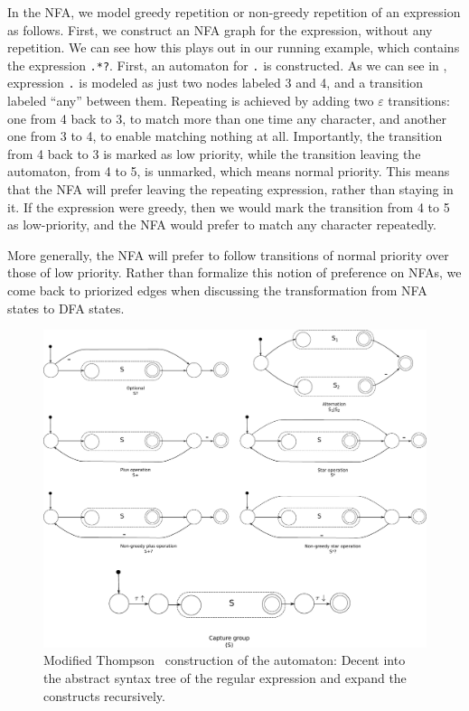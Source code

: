 \documentclass[english]{sigplanconf}
\theoremstyle{definition}
\begin{document}
In the NFA, we model greedy repetition or non-greedy repetition of
an expression as follows.  First, we construct an NFA graph for the
expression, without any repetition.  We can see how this plays out
in our running example, which contains the expression \texttt{.*?}.
First, an automaton for \texttt{.} is constructed.  As we can see
in , expression \texttt{.} is modeled as
just two nodes labeled 3 and 4, and a transition labeled ``any''
between them.  Repeating is achieved by adding two $\varepsilon$
transitions: one from 4 back to 3, to match more than one time any
character, and another one from 3 to 4, to enable matching nothing
at all.  Importantly, the transition from 4 back to 3 is marked as
low priority, while the transition leaving the automaton, from 4
to 5, is unmarked, which means normal priority.  This means that
the NFA will prefer leaving the repeating expression, rather than
staying in it.  If the expression were greedy, then we would mark
the transition from 4 to 5 as low-priority, and the NFA would prefer
to match any character repeatedly.

More generally, the NFA will prefer to follow transitions of normal
priority over those of low priority. Rather than formalize this
notion of preference on NFAs, we come back to priorized edges when
discussing the transformation from NFA states to DFA states.


\begin{figure}[tb]
\includegraphics[width=\linewidth]{graphs/thompson}
\caption{Modified Thompson~\cite{Thom68a} construction of the automaton: Decent into the abstract syntax tree of the regular expression and expand the constructs recursively.}
\label{fig:thompson-construction}
\end{figure}
\end{document}
